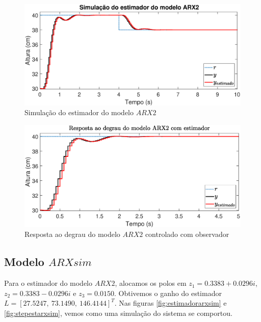 \begin{figure}[H]
	\centering
	\includegraphics[width=1\linewidth]{estimadorarx2}
	\caption[Simulação do estimador do modelo $ARX2$]{Simulação do estimador do modelo $ARX2$}
	\label{fig:estimadorarx2}
\end{figure}

\begin{figure}[H]
	\centering
	\includegraphics[width=1\linewidth]{stepestarx2}
	\caption[Resposta ao degrau do modelo $ARX2$ controlado com observador]{Resposta ao degrau do modelo $ARX2$ controlado com observador}
	\label{fig:stepestarx2}
\end{figure}

\subsection{Modelo $ARXsim$}\label{s:estarxsim}
Para o estimador do modelo $ARX2$, alocamos os polos em $z_1=0.3383 + 0.0296i$, $z_2=0.3383 - 0.0296i$ e $z_3=0.0150$. Obtivemos o ganho do estimador $L=[27.5247,~ 73.1490,~ 146.4144]^T$. Nas figuras \ref{fig:estimadorarxsim} e \ref{fig:stepestarxsim}, vemos como uma simulação do sistema se comportou.

